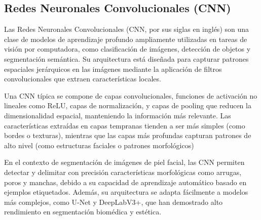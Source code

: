 \subsection{Redes Neuronales Convolucionales (CNN)}


Las Redes Neuronales Convolucionales (CNN, por sus siglas en inglés) son una clase de modelos de aprendizaje profundo ampliamente utilizadas en tareas de visión por computadora, como clasificación de imágenes, detección de objetos y segmentación semántica. Su arquitectura está diseñada para capturar patrones espaciales jerárquicos en las imágenes mediante la aplicación de filtros convolucionales que extraen características locales. \parencite{lecun1998gradient}

Una CNN típica se compone de capas convolucionales, funciones de activación no lineales como ReLU, capas de normalización, y capas de pooling que reducen la dimensionalidad espacial, manteniendo la información más relevante. Las características extraídas en capas tempranas tienden a ser más simples (como bordes o texturas), mientras que las capas más profundas capturan patrones de alto nivel (como estructuras faciales o patrones morfológicos) \parencite{krizhevsky2012imagenet}

En el contexto de segmentación de imágenes de piel facial, las CNN permiten detectar y delimitar con precisión características morfológicas como arrugas, poros y manchas, debido a su capacidad de aprendizaje automático basado en ejemplos etiquetados. Además, su arquitectura se adapta fácilmente a modelos más complejos, como U-Net y DeepLabV3+, que han demostrado alto rendimiento en segmentación biomédica y estética. \parencite{ronneberger2015unet}



